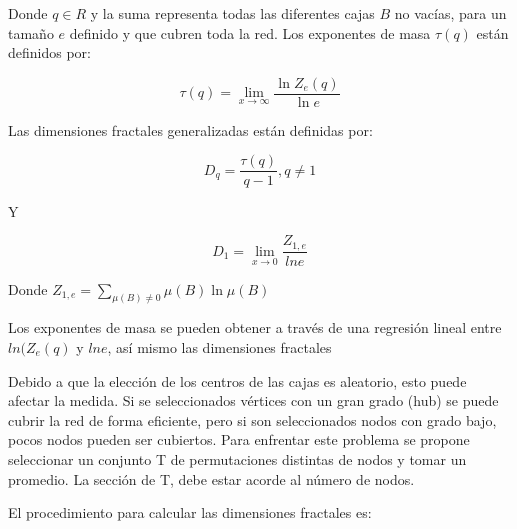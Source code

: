 Donde $q\in R$ y la suma representa todas las diferentes cajas $B$ no vacías, para un tamaño $e$ definido y que cubren toda la red. Los exponentes de masa $\tau(q)$ están definidos por:

\begin{equation}
    \tau(q) = \lim_{x \to \infty} \frac{\ln Z_e(q)}{\ln e}
\end{equation}

Las dimensiones fractales generalizadas están definidas por:

\begin{equation}
    D_q = \frac{\tau(q)}{q-1}, q \neq 1
\end{equation}

Y

\begin{equation}
    D_1 = \lim_{x \to 0} \frac{Z_{1,e}}{ln e}
\end{equation}

Donde $Z_{1,e} = \sum \limits_{\mu(B) \neq 0} \mu(B) \ln \mu(B)$

Los exponentes de masa se pueden obtener a través de una regresión lineal entre $ln(Z_e(q)$ y $ln e$, así mismo las dimensiones fractales 

Debido a que la elección de los centros de las cajas es aleatorio, esto puede afectar la medida. Si se seleccionados vértices con un gran grado (hub) se puede cubrir la red de forma eficiente, pero si son seleccionados nodos con grado bajo, pocos nodos pueden ser cubiertos. Para enfrentar este problema se propone seleccionar un conjunto T de permutaciones distintas de nodos y tomar un promedio. La sección de T, debe estar acorde al número de nodos.

El procedimiento para calcular las dimensiones fractales es:

